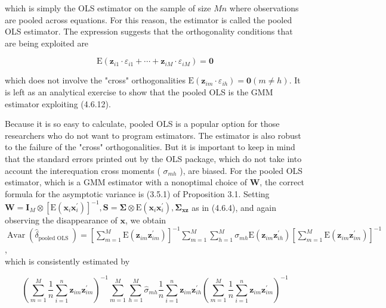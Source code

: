 \documentclass[10pt]{article}
\begin{document}
which is simply the OLS estimator on the sample of size $M n$ where observations are pooled across equations. For this reason, the estimator is called the pooled OLS estimator. The expression suggests that the orthogonality conditions that are being exploited are


\begin{equation*}
\mathrm{E}\left(\mathbf{z}_{i 1} \cdot \varepsilon_{i 1}+\cdots+\mathbf{z}_{i M} \cdot \varepsilon_{i M}\right)=\mathbf{0} \tag{4.6.12}
\end{equation*}


which does not involve the "cross" orthogonalities $\mathrm{E}\left(\mathbf{z}_{i m} \cdot \varepsilon_{i h}\right)=\mathbf{0}(m \neq h)$. It is left as an analytical exercise to show that the pooled OLS is the GMM estimator exploiting (4.6.12).

Because it is so easy to calculate, pooled OLS is a popular option for those researchers who do not want to program estimators. The estimator is also robust to the failure of the "cross" orthogonalities. But it is important to keep in mind that the standard errors printed out by the OLS package, which do not take into account the interequation cross moments ( $\sigma_{m h}$ ), are biased. For the pooled OLS estimator, which is a GMM estimator with a nonoptimal choice of $\widehat{\mathbf{W}}$, the correct formula for the asymptotic variance is (3.5.1) of Proposition 3.1. Setting $\mathbf{W}= \mathbf{I}_{M} \otimes\left[\mathrm{E}\left(\mathbf{x}_{i} \mathbf{x}_{i}^{\prime}\right)\right]^{-1}, \mathbf{S}=\boldsymbol{\Sigma} \otimes \mathrm{E}\left(\mathbf{x}_{i} \mathbf{x}_{i}^{\prime}\right), \boldsymbol{\Sigma}_{\mathbf{x z}}$ as in (4.6.4), and again observing the disappearance of $\mathbf{x}$, we obtain\\
$\operatorname{Avar}\left(\hat{\delta}_{\text {pooled OLS }}\right)=\left[\sum_{m=1}^{M} \mathrm{E}\left(\mathbf{z}_{i m} \mathbf{z}_{i m}^{\prime}\right)\right]^{-1} \sum_{m=1}^{M} \sum_{h=1}^{M} \sigma_{m h} \mathrm{E}\left(\mathbf{z}_{i m} \mathbf{z}_{i h}^{\prime}\right)\left[\sum_{m=1}^{M} \mathrm{E}\left(\mathbf{z}_{i m} \mathbf{z}_{i m}^{\prime}\right)\right]^{-1}$,\\
which is consistently estimated by


\begin{equation*}
\left(\sum_{m=1}^{M} \frac{1}{n} \sum_{i=1}^{n} \mathbf{z}_{i m} \mathbf{z}_{i m}^{\prime}\right)^{-1} \sum_{m=1}^{M} \sum_{h=1}^{M} \hat{\sigma}_{m h} \frac{1}{n} \sum_{i=1}^{n} \mathbf{z}_{i m} \mathbf{z}_{i h}^{\prime}\left(\sum_{m=1}^{M} \frac{1}{n} \sum_{i=1}^{n} \mathbf{z}_{i m} \mathbf{z}_{i m}^{\prime}\right)^{-1} \tag{4.6.14}
\end{equation*}
\end{document}
